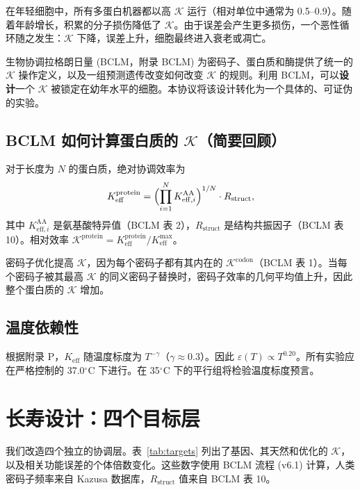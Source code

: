 \documentclass[12pt,a4paper]{article}
\newcommand{\REL}{\mathcal{K}}          %
\begin{document}
	在年轻细胞中，所有多蛋白机器都以高 \(\REL\) 运行（相对单位中通常为 0.5–0.9）。随着年龄增长，积累的分子损伤降低了 \(\REL\)。由于误差会产生更多损伤，一个恶性循环随之发生：\(\REL\) 下降，误差上升，细胞最终进入衰老或凋亡。
	
	生物协调拉格朗日量 (BCLM，附录 BCLM) 为密码子、蛋白质和酶提供了统一的 \(\REL\) 操作定义，以及一组预测遗传改变如何改变 \(\REL\) 的规则。利用 BCLM，可以\textbf{设计}一个 \(\REL\) 被锁定在幼年水平的细胞。本协议将该设计转化为一个具体的、可证伪的实验。
	
	\subsection{BCLM 如何计算蛋白质的 \(\REL\)（简要回顾）}
	对于长度为 \(N\) 的蛋白质，绝对协调效率为
	\[
	K_{\mathrm{eff}}^{\mathrm{protein}} = \Bigl( \prod_{i=1}^{N} K_{\mathrm{eff},i}^{\mathrm{AA}} \Bigr)^{1/N} \cdot R_{\mathrm{struct}},
	\]
	其中 \(K_{\mathrm{eff},i}^{\mathrm{AA}}\) 是氨基酸特异值（BCLM 表 2），\(R_{\mathrm{struct}}\) 是结构共振因子（BCLM 表 10）。相对效率 \(\REL^{\mathrm{protein}} = K_{\mathrm{eff}}^{\mathrm{protein}}/K_{\mathrm{eff}}^{\max}\)。
	
	密码子优化提高 \(\REL\)，因为每个密码子都有其内在的 \(\REL^{\mathrm{codon}}\)（BCLM 表 1）。当每个密码子被其最高 \(\REL\) 的同义密码子替换时，密码子效率的几何平均值上升，因此整个蛋白质的 \(\REL\) 增加。
	
	\subsection{温度依赖性}
	根据附录 P，\(K_{\mathrm{eff}}\) 随温度标度为 \(T^{-\gamma}\)（\(\gamma\approx0.3\)）。因此 \(\varepsilon(T) \propto T^{0.20}\)。所有实验应在严格控制的 37.0\(^\circ\)C 下进行。在 35\(^\circ\)C 下的平行组将检验温度标度预言。
	
	\section{长寿设计：四个目标层}
	\label{sec:layers}
	我们改造四个独立的协调层。表~\ref{tab:targets} 列出了基因、其天然和优化的 \(\REL\)，以及相关功能误差的个体倍数变化。这些数字使用 BCLM 流程 (v6.1) 计算，人类密码子频率来自 Kazusa 数据库，\(R_{\mathrm{struct}}\) 值来自 BCLM 表 10。
	
\end{document}
